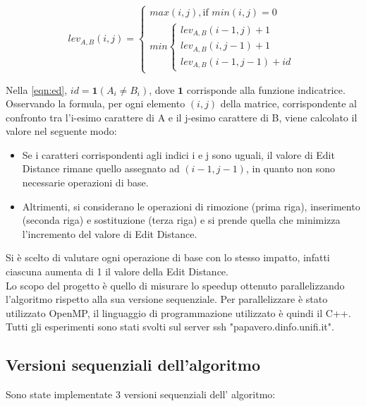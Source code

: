 \documentclass[10pt,twocolumn,letterpaper]{article}
\newcommand{\bit} {\begin{itemize} }
\newcommand{\eit} {\end{itemize} }
\begin{document}
\begin{equation}
    \label{eqn:ed}
    lev_{A,B}(i,j) = \begin{cases}
        max(i,j), \text{if } min(i,j) = 0\\
        min \begin{cases}
            lev_{A,B}(i-1,j) + 1\\
            lev_{A,B}(i,j-1) + 1\\
            lev_{A,B}(i-1,j-1) + id
        \end{cases}
    \end{cases}
\end{equation}

Nella \cref{eqn:ed}, $id = \bm{1}(A_{i} \neq B_{i})$, dove $\bm{1}$ corrisponde alla funzione indicatrice.\\
Osservando la formula, per ogni elemento $(i, j)$ della matrice, corrispondente al confronto tra l'i-esimo carattere di A e il j-esimo carattere di B, viene calcolato il valore nel seguente modo:

\bit
    \item{Se i caratteri corrispondenti agli indici i e j sono uguali, il valore di Edit Distance rimane quello assegnato ad $(i - 1, j - 1)$, in quanto non sono necessarie operazioni di base.}
    \item{Altrimenti, si considerano le operazioni di rimozione (prima riga), inserimento (seconda riga) e sostituzione (terza riga) e si prende quella che minimizza l'incremento del valore di Edit Distance.}
\eit

Si è scelto di valutare ogni operazione di base con lo stesso impatto, infatti ciascuna aumenta di 1 il valore della Edit Distance.\\
Lo scopo del progetto è quello di misurare lo speedup ottenuto parallelizzando l'algoritmo rispetto alla sua versione sequenziale. Per parallelizzare è stato utilizzato OpenMP, il linguaggio di programmazione utilizzato è quindi il C++.\\
Tutti gli esperimenti sono stati svolti sul server ssh "papavero.dinfo.unifi.it".

\subsection{Versioni sequenziali dell'algoritmo}

Sono state implementate 3 versioni sequenziali dell' algoritmo:
\end{document}

